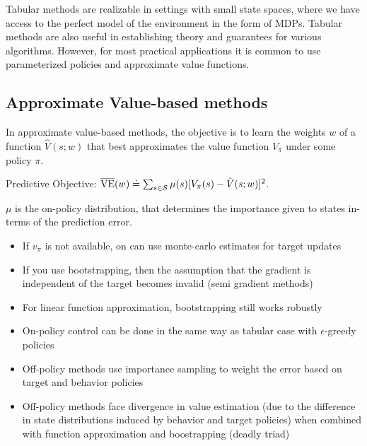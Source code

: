 Tabular methods are realizable in settings with small state spaces, where we have access to the
perfect model of the environment in the form of MDPs.
Tabular methods are also useful in establishing theory and guarantees for various algorithms.
However, for most practical applications it is common to use parameterized policies and approximate
value functions.

\subsection{Approximate Value-based methods}
In approximate value-based methods, the objective is to learn the weights $w$ of a function
$\hat{V}(s;w)$ that best approximates the value function $V_\pi$ under some policy $\pi$.

Predictive Objective: $\overline{\text{VE}}(w) \doteq \sum_{s \in \mathcal{S}} \mu(s) [V_\pi(s) -
		\hat{V}(s;w)]^2$.

$\mu$ is the on-policy distribution, that determines the importance given to states in-terms of the prediction error.
\begin{itemize}
	\item If $v_\pi$ is not available, on can use monte-carlo estimates for target updates
	\item If you use bootstrapping, then the assumption that the gradient is independent of the target becomes invalid (semi gradient methods)
	\item For linear function approximation, bootstrapping still works robustly
	\item On-policy control can be done in the same way as tabular case with $\epsilon$-greedy policies
	\item Off-policy methods use importance sampling to weight the error based on target and behavior policies
	\item Off-policy methods face divergence in value estimation (due to the difference in state distributions induced by behavior and target policies)
	      when combined with function approximation and boostrapping (deadly triad)
\end{itemize}

